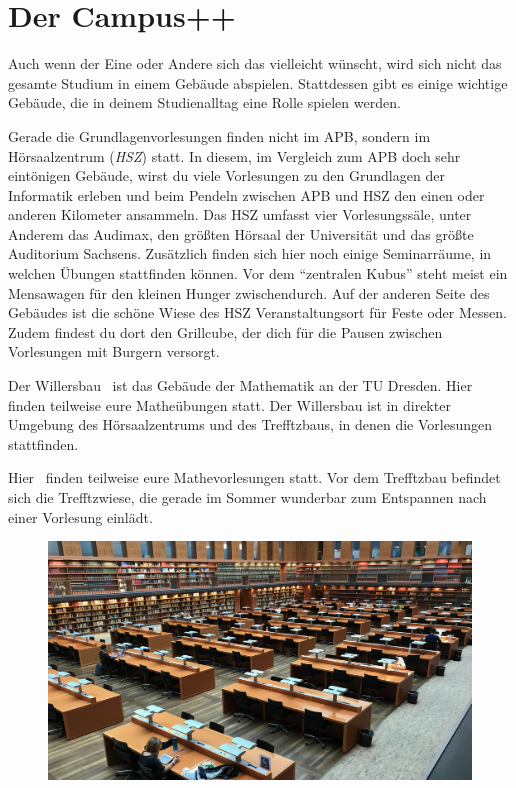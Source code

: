 \chapter*{Der Campus++}

Auch wenn der Eine oder Andere sich das vielleicht wünscht, wird sich nicht das gesamte Studium in einem Gebäude abspielen.
Stattdessen gibt es einige wichtige Gebäude, die in deinem Studienalltag eine Rolle spielen werden.

Gerade die Grundlagenvorlesungen finden nicht im APB, sondern im Hörsaalzentrum (\emph{HSZ}) statt.
In diesem, im Vergleich zum APB doch sehr eintönigen Gebäude, wirst du viele Vorlesungen zu den Grundlagen der Informatik erleben und beim Pendeln zwischen APB und HSZ den einen oder anderen Kilometer ansammeln.
Das HSZ umfasst vier Vorlesungssäle, unter Anderem das Audimax, den größten Hörsaal der Universität und das größte Auditorium Sachsens.
Zusätzlich finden sich hier noch einige Seminarräume, in welchen Übungen stattfinden können. Vor dem \enquote{zentralen Kubus} steht meist ein Mensawagen für den kleinen Hunger zwischendurch.
Auf der anderen Seite des Gebäudes ist die schöne Wiese des HSZ Veranstaltungsort für Feste oder Messen.
Zudem findest du dort den Grillcube, der dich für die Pausen zwischen Vorlesungen mit Burgern versorgt.

Der Willersbau~ ist das Gebäude der Mathematik an der TU Dresden. Hier finden teilweise eure Matheübungen statt. Der Willersbau ist in direkter Umgebung
des Hörsaalzentrums und des Trefftzbaus, in denen die Vorlesungen stattfinden. 

Hier~ finden teilweise eure Mathevorlesungen statt. Vor dem Trefftzbau befindet sich die Trefftzwiese, die gerade im Sommer wunderbar zum Entspannen nach
einer Vorlesung einlädt. 

\begin{figure}[b!]
    \centering
    \includegraphics[width=\linewidth]{img/slub-lesesaal}
\end{figure}

